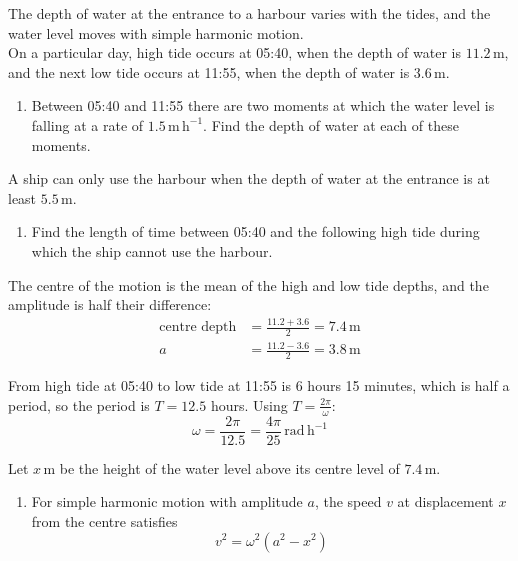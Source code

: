 \documentclass[leqno]{article}
\begin{document}
\begin{enumerate}[
  label=\textbf{\arabic*.},
  leftmargin=*,
  topsep=0pt,
  partopsep=0pt,
  parsep=0pt
]
The depth of water at the entrance to a harbour varies with the tides, and the water level moves with simple harmonic motion. \\
On a particular day, high tide occurs at 05:40, when the depth of water is $11.2\,\mathrm{m}$, and the next low tide occurs at 11:55, when the depth of water is $3.6\,\mathrm{m}$. \\
\begin{enumerate}[label=\textbf{(\alph*)}]
  \item Between 05:40 and 11:55 there are two moments at which the water level is falling at a rate of $1.5\,\mathrm{m\,h^{-1}}$. Find the depth of water at each of these moments.  \\
\end{enumerate}
A ship can only use the harbour when the depth of water at the entrance is at least $5.5\,\mathrm{m}$. \\
\begin{enumerate}[label=\textbf{(\alph*)}, resume]
  \item Find the length of time between 05:40 and the following high tide during which the ship cannot use the harbour.  \\
\end{enumerate}

\vspace*{10pt}

\begin{djsSolution}
The centre of the motion is the mean of the high and low tide depths, and the amplitude is half their difference:
\begin{align*}
\text{centre depth}&=\frac{11.2+3.6}{2}=7.4\,\mathrm{m}\\
a&=\frac{11.2-3.6}{2}=3.8\,\mathrm{m}
\end{align*}

From high tide at 05:40 to low tide at 11:55 is 6 hours 15 minutes, which is half a period, so the period is \(T=12.5\) hours. Using \(T=\frac{2\pi}{\omega}\):
\[
\omega=\frac{2\pi}{12.5}=\frac{4\pi}{25}\,\mathrm{rad\,h^{-1}}
\]

Let \(x\,\mathrm{m}\) be the height of the water level above its centre level of \(7.4\,\mathrm{m}\).
\begin{enumerate}[label=\textbf{(\alph*)}, start=1]
  \item For simple harmonic motion with amplitude \(a\), the speed \(v\) at displacement \(x\) from the centre satisfies
\[
v^2=\omega^2\left(a^2-x^2\right)
\]


\end{enumerate}
\end{djsSolution}
\end{enumerate}
\end{document}
